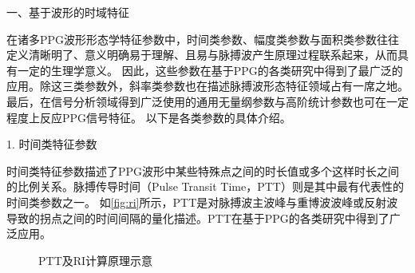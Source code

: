 一、基于波形的时域特征

在诸多PPG波形形态学特征参数中，时间类参数、幅度类参数与面积类参数往往定义清晰明了、意义明确易于理解、且易与脉搏波产生原理过程联系起来，从而具有一定的生理学意义。
因此，这些参数在基于PPG的各类研究中得到了最广泛的应用\cite{cwl,mmt}。除这三类参数外，斜率类参数也在描述脉搏波形态特征领域占有一席之地。
最后，在信号分析领域得到广泛使用的通用无量纲参数与高阶统计参数也可在一定程度上反应PPG信号特征。
以下是各类参数的具体介绍。

1. 时间类特征参数

时间类特征参数描述了PPG波形中某些特殊点之间的时长值或多个这样时长之间的比例关系。脉搏传导时间（Pulse Transit Time，PTT）则是其中最有代表性的时间类参数之一。
如\autoref{fig:ri}所示，PTT是对脉搏波主波峰与重博波波峰或反射波导致的拐点之间的时间间隔的量化描述\cite{Brumfield2005,Su2014}。PTT在基于PPG的各类研究中得到了广泛应用。
\begin{figure}[htbp]
    \centering
    \quad
    \caption[PTT及RI计算原理示意]{\label{fig:ri}PTT及RI计算原理示意\cite{Su2014}}
\end{figure}

